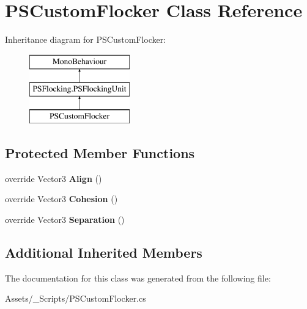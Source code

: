 \hypertarget{class_p_s_custom_flocker}{}\section{P\+S\+Custom\+Flocker Class Reference}
\label{class_p_s_custom_flocker}
Inheritance diagram for P\+S\+Custom\+Flocker\+:\begin{figure}[H]
\begin{center}
\leavevmode
\includegraphics[height=3.000000cm]{class_p_s_custom_flocker}
\end{center}
\end{figure}
\subsection*{Protected Member Functions}
\begin{DoxyCompactItemize}
\item 
\mbox{\label{class_p_s_custom_flocker_a50d8ac4146196420bcf1181289a27e40}} 
override Vector3 {\bfseries Align} ()
\item 
\mbox{\label{class_p_s_custom_flocker_a46d7ff69872c12983a666293794b976f}} 
override Vector3 {\bfseries Cohesion} ()
\item 
\mbox{\label{class_p_s_custom_flocker_a2ab0990e603a5102fc80dafee1333c7c}} 
override Vector3 {\bfseries Separation} ()
\end{DoxyCompactItemize}
\subsection*{Additional Inherited Members}


The documentation for this class was generated from the following file\+:\begin{DoxyCompactItemize}
\item 
Assets/\+\_\+\+Scripts/P\+S\+Custom\+Flocker.\+cs\end{DoxyCompactItemize}
